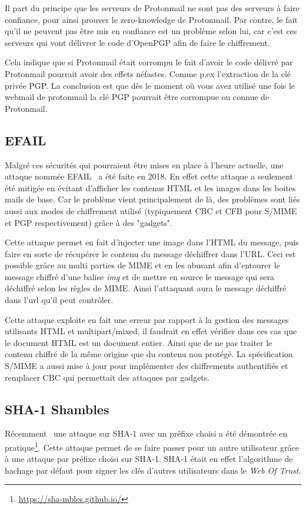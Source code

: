 Il part du principe que les serveurs de Protonmail ne sont pas des serveurs à faire confiance, pour ainsi prouver le zero-knowledge de Protonmail. Par contre, le fait qu'il ne peuvent pas être mis en confiance est un problème selon lui, car c'est ces serveurs qui vont délivrer le code d'OpenPGP afin de faire le chiffrement.

Cela indique que si Protonmail était corrompu le fait d'avoir le code délivré par Protonmail pourrait avoir des effets néfastes. Comme p.ex l'extraction de la clé privée PGP. La conclusion est que dès le moment où vous avez utilisé une fois le webmail de protonmail la clé PGP pourrait être corrompue ou connue de Protonmail.
\subsection{EFAIL}
\label{attacks:EFAIL}
Malgré ces sécurités qui pourraient être mises en place à l’heure actuelle, une attaque nommée EFAIL~\cite{DBLP:conf/uss/PoddebniakD0ISF18} a été faite en 2018. En effet cette attaque a seulement été mitigée en évitant d’afficher les contenus HTML et les images dans les boites mails de base. Car le problème vient principalement de là, des problèmes sont liés aussi aux modes de chiffrement utilisé (typiquement CBC et CFB pour S/MIME et PGP respectivement) grâce à des "gadgets".

Cette attaque permet en fait d'injecter une image dans l'HTML du message, puis faire en sorte de récupérer le contenu du message déchiffrer dans l'URL. Ceci est possible grâce au multi parties de MIME et en les abusant afin d'entourer le message chiffré d'une balise \textit{img} et de mettre en source le message qui sera déchiffré selon les règles de MIME. Ainsi l'attaquant aura le message déchiffré dans l'url qu'il peut contrôler. 

Cette attaque exploite en fait une erreur par rapport à la gestion des messages utilisants HTML et multipart/mixed, il faudrait en effet vérifier dans ces cas que le document HTML est un document entier. Ainsi que de ne pas traiter le contenu chiffré de la même origine que du contenu non protégé. La spécification~\cite{RFC8551} S/MIME a aussi mise à jour pour implémenter des chiffrements authentifiés et remplacer CBC qui permettait des attaques par gadgets.
\subsection{SHA-1 Shambles}
Récemment~\cite{DBLP:journals/iacr/LeurentP20} une attaque sur SHA-1 avec un préfixe choisi a été démontrée en pratique\footnote{\url{https://sha-mbles.github.io/}}. Cette attaque permet de se faire passer pour un autre utilisateur grâce à une attaque par préfixe choisi sur SHA-1. SHA-1 était en effet l'algorithme de hachage par défaut pour signer les clés d'autres utilisateurs dans le \textit{Web Of Trust}.


